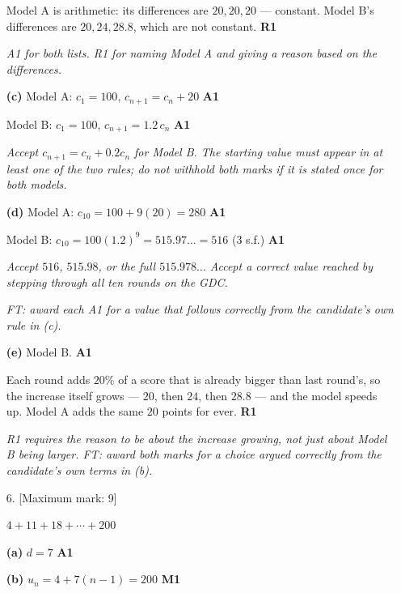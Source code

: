 \documentclass[12pt, twoside]{article}
\begin{document}
\begin{enumerate}[itemsep=0.3cm]
Model A is arithmetic: its differences are $20, 20, 20$ --- constant. Model
B's differences are $20, 24, 28.8$, which are not constant.
\hfill \textbf{R1}

\emph{A1 for both lists. R1 for naming Model A \emph{and} giving a reason
based on the differences.}

\medskip

\textbf{(c)} Model A: $c_{1} = 100$, \quad $c_{n+1} = c_{n} + 20$
\hfill \textbf{A1}

Model B: $c_{1} = 100$, \quad $c_{n+1} = 1.2\,c_{n}$ \hfill \textbf{A1}

\emph{Accept $c_{n+1} = c_{n} + 0.2c_{n}$ for Model B. The starting value
must appear in at least one of the two rules; do not withhold both marks if
it is stated once for both models.}

\medskip

\textbf{(d)} Model A: $c_{10} = 100 + 9(20) = 280$ \hfill \textbf{A1}

Model B: $c_{10} = 100(1.2)^{9} = 515.97\ldots = 516$ (3 s.f.)
\hfill \textbf{A1}

\emph{Accept $516$, $515.98$, or the full $515.978\ldots$ Accept a correct
value reached by stepping through all ten rounds on the GDC.}

\emph{FT: award each A1 for a value that follows correctly from the
candidate's own rule in (c).}

\medskip

\textbf{(e)} Model B. \hfill \textbf{A1}

Each round adds $20\%$ of a score that is already bigger than last round's,
so the increase itself grows --- $20$, then $24$, then $28.8$ --- and the
model speeds up. Model A adds the same $20$ points for ever.
\hfill \textbf{R1}

\emph{R1 requires the reason to be about the \emph{increase} growing, not
just about Model B being larger. FT: award both marks for a choice argued
correctly from the candidate's own terms in (b).}

\newpage

\item[6.] [Maximum mark: 9]

$4 + 11 + 18 + \cdots + 200$

\medskip

\textbf{(a)} $d = 7$ \hfill \textbf{A1}

\medskip

\textbf{(b)} $u_{n} = 4 + 7(n - 1) = 200$ \hfill \textbf{M1}


\end{enumerate}
\end{document}
